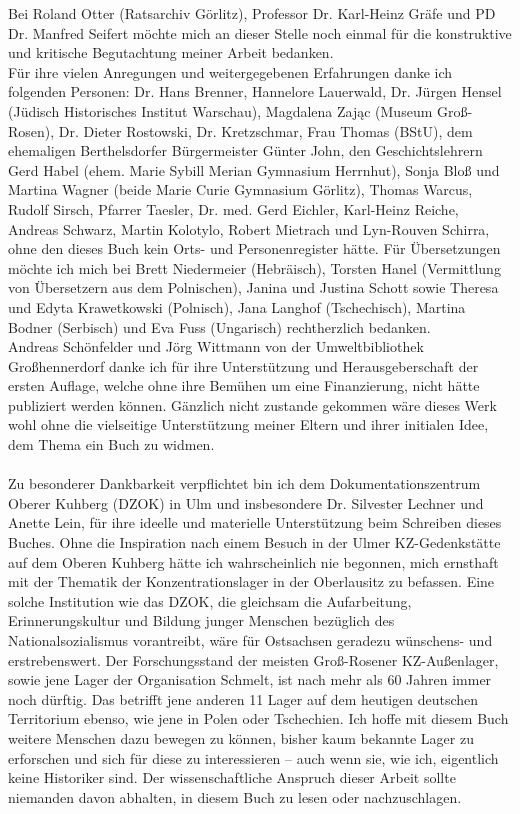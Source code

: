 \documentclass[a4paper,12pt,ngerman,
]{nisebook}
\begin{document}
Bei Roland Otter (Ratsarchiv Görlitz), Professor Dr. Karl-Heinz Gräfe und PD Dr. Manfred Seifert möchte mich an dieser Stelle noch einmal für die konstruktive und kritische Begutachtung meiner Arbeit bedanken.
\\
Für ihre vielen Anregungen und weitergegebenen Erfahrungen danke ich folgenden Personen: Dr. Hans Brenner, Hannelore Lauerwald, Dr. Jürgen Hensel (Jüdisch Historisches Institut Warschau), Magdalena Zając (Museum Groß-Rosen), Dr. Dieter Rostowski, Dr. Kretzschmar, Frau Thomas (BStU), dem ehemaligen Berthelsdorfer Bürgermeister Günter John, den Geschichtslehrern Gerd Habel (ehem. Marie Sybill Merian Gymnasium Herrnhut), Sonja Bloß und Martina Wagner (beide Marie Curie Gymnasium Görlitz), Thomas Warcus, Rudolf Sirsch, Pfarrer Taesler, Dr. med. Gerd Eichler, Karl-Heinz Reiche, Andreas Schwarz, Martin Kolotylo, Robert Mietrach und Lyn-Rouven Schirra, ohne den dieses Buch kein Orts- und Personenregister hätte.
Für Übersetzungen möchte ich mich bei Brett Niedermeier (Hebräisch), Torsten Hanel (Vermittlung von Übersetzern aus dem Polnischen), Janina und Justina Schott sowie Theresa und Edyta Krawetkowski (Polnisch), Jana Langhof (Tschechisch), Martina Bodner (Serbisch) und Eva Fuss (Ungarisch) rechtherzlich bedanken.
\\
Andreas Schönfelder und Jörg Wittmann von der Umweltbibliothek Großhennerdorf danke ich für ihre Unterstützung und Herausgeberschaft der ersten Auflage, welche ohne ihre Bemühen um eine Finanzierung, nicht hätte publiziert werden können. Gänzlich nicht zustande gekommen wäre dieses Werk wohl ohne die vielseitige Unterstützung meiner Eltern und ihrer initialen Idee, dem Thema ein Buch zu widmen.\\
\\
Zu besonderer Dankbarkeit verpflichtet bin ich dem Dokumentationszentrum Oberer Kuhberg (DZOK) in Ulm und insbesondere Dr. Silvester Lechner und Anette Lein, für ihre ideelle und materielle Unterstützung beim Schreiben dieses Buches. Ohne die Inspiration nach einem Besuch in der Ulmer KZ-Gedenkstätte auf dem Oberen Kuhberg hätte ich wahrscheinlich nie begonnen, mich ernsthaft mit der Thematik der Konzentrationslager in der Oberlausitz zu befassen. Eine solche Institution wie das DZOK, die gleichsam die Aufarbeitung, Erinnerungskultur und Bildung junger Menschen bezüglich des Nationalsozialismus vorantreibt, wäre für Ostsachsen geradezu wünschens- und erstrebenswert. Der Forschungsstand der meisten Groß-Rosener KZ-Außenlager, sowie jene Lager der Organisation Schmelt, ist nach mehr als 60 Jahren immer noch dürftig. Das betrifft jene anderen 11 Lager auf dem heutigen deutschen Territorium ebenso, wie jene in Polen oder Tschechien. Ich hoffe mit diesem Buch weitere Menschen dazu bewegen zu können, bisher kaum bekannte Lager zu erforschen und sich für diese zu interessieren -- auch wenn sie, wie ich, eigentlich keine Historiker sind. Der wissenschaftliche Anspruch dieser Arbeit sollte niemanden davon abhalten, in diesem Buch zu lesen oder nachzuschlagen.
\end{document}
